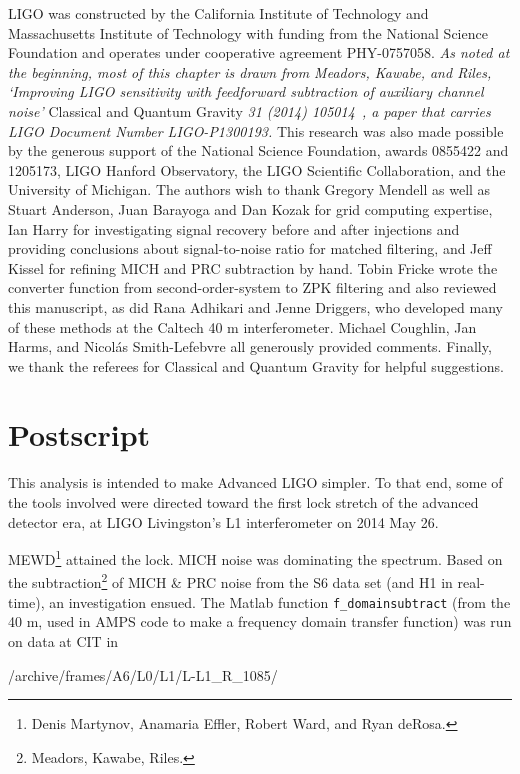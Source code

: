 LIGO was constructed by the California Institute of Technology and Massachusetts Institute of Technology with funding from the National Science Foundation and operates under cooperative agreement PHY-0757058. 
\textit{As noted at the beginning, most of this chapter is drawn from Meadors, Kawabe, and Riles, `Improving LIGO sensitivity with feedforward subtraction of auxiliary channel noise'} Classical and Quantum Gravity \textit{31 (2014) 105014~\cite{MeadorsFeedforward2014}, a paper that carries LIGO Document Number LIGO-P1300193. }
This research was also made possible by the generous support of the National Science Foundation, awards 0855422 and 1205173, LIGO Hanford Observatory, the LIGO Scientific Collaboration, and the University of Michigan. The authors wish to thank Gregory Mendell as well as Stuart Anderson, Juan Barayoga and Dan Kozak for grid computing expertise, Ian Harry for investigating signal recovery before and after injections and providing conclusions about signal-to-noise ratio for matched filtering, and Jeff Kissel for refining MICH and PRC subtraction by hand. Tobin Fricke wrote the converter function from second-order-system to ZPK filtering and also reviewed this manuscript, as did Rana Adhikari and Jenne Driggers, who developed many of these methods at the Caltech 40 m interferometer. Michael Coughlin, Jan Harms, and Nicol\'{a}s Smith-Lefebvre all generously provided comments. Finally, we thank the referees for Classical and Quantum Gravity for helpful suggestions.

\section{Postscript}

This analysis is intended to make Advanced LIGO simpler. To that end, some of the tools involved were directed toward the first lock stretch of the advanced detector era, at LIGO Livingston's L1 interferometer on 2014 May 26.

MEWD\footnote{Denis Martynov, Anamaria Effler, Robert Ward, and Ryan deRosa.} attained the lock. MICH noise was dominating the spectrum. Based on the subtraction\footnote{Meadors, Kawabe, Riles.} of MICH \& PRC noise from the S6 data set (and H1 in real-time), an investigation ensued.
The Matlab function \texttt{f\_domainsubtract} (from the 40 m, used in AMPS code to make a frequency domain transfer function) was run on data at CIT in

/archive/frames/A6/L0/L1/L-L1\_R\_1085/

